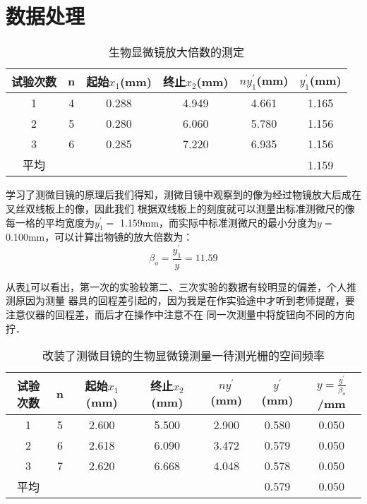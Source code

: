 \date{}
\makeatother

	\pagestyle{fancy}
	\chead{}
	\rhead{}
	\thispagestyle{fancy}
	\section{\Large{数据处理}}
		\begin{table}[ht]
			\centering
			\caption{生物显微镜放大倍数的测定}
			\label{倍数测定}
			\begin{tabular}{cccccc}
				\toprule
				试验次数 & n &起始$x_1$(mm) & 终止$x_2$(mm) & $ny_{1}^{'}$(mm) & $y_{1}^{'}$(mm)\\
				\midrule
				1 & 4 & 0.288 & 4.949 & 4.661 & 1.165\\
				2 & 5 & 0.280 & 6.060 & 5.780 & 1.156\\
				3 & 6 & 0.285 & 7.220 & 6.935 & 1.156\\
				平均 & & & & & 1.159\\
				\bottomrule
			\end{tabular}
		\end{table}
		\par
		学习了测微目镜的原理后我们得知，测微目镜中观察到的像为经过物镜放大后成在叉丝双线板上的像，因此我们
		根据双线板上的刻度就可以测量出标准测微尺的像每一格的平均宽度为$y_{1}^{'} = $ 1.159mm，而实际中标准测微尺的最小分度为$y = $ 0.100mm，可以计算出物镜的放大倍数为：
		$$\beta_o = \frac{y_{1}^{'}}{y} = 11.59$$
		\par
		从表\ref{倍数测定}可以看出，第一次的实验较第二、三次实验的数据有较明显的偏差，个人推测原因为测量
		器具的回程差引起的，因为我是在作实验途中才听到老师提醒，要注意仪器的回程差，而后才在操作中注意不在
		同一次测量中将旋钮向不同的方向拧．
		\begin{table}[ht]
			\centering
			\caption{改装了测微目镜的生物显微镜测量一待测光栅的空间频率}
			\label{测微目镜测量}
			\begin{tabular}{ccccccc}
				\toprule
				试验次数 & n & 起始$x_1$(mm) & 终止$x_2$(mm) & $ny^{'}$(mm) & $y^{'}$(mm) & $y = \frac{y^{'}}{\beta_o}$/mm\\
				\midrule
				1 & 5 & 2.600 & 5.500 & 2.900 & 0.580 & 0.050\\
				2 & 6 & 2.618 & 6.090 & 3.472 & 0.579 & 0.050\\
				3 & 7 & 2.620 & 6.668 & 4.048 & 0.578 & 0.050\\
				平均 & & & & & 0.579 & 0.050\\
				\bottomrule
			\end{tabular}
		\end{table}
